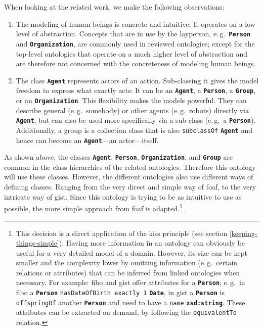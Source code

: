 \documentclass[a4paper, DIV=13, BCOR=0cm]{scrbook}
\newcommand{\eg}{e.\,g.\ }
\newcommand{\class}[1]{\texttt{\textbf{#1}}}
\newcommand{\relation}[1]{\texttt{#1}}
\begin{document}
When looking at the related work, we make the following observations:
\begin{enumerate}
	\item The modeling of human beings is concrete and intuitive: It operates on a low level of abstraction. Concepts that are in use by the layperson, \eg \class{Person} and \class{Organization}, are commonly used in reviewed ontologies; except for the top-level ontologies that operate on a much higher level of abstraction and are therefore not concerned with the concreteness of modeling human beings.
	\item The class \class{Agent} represents actors of an action. Sub-classing it gives the model freedom to express what exactly acts: It can be an \class{Agent}, a \class{Person}, a \class{Group}, or an \class{Organization}. This flexibility makes the models powerful. They can describe general (\eg somebody) or other agents (\eg robots) directly via \class{Agent}, but can also be used more specifically via a sub-class (\eg a \class{Person}). Additionally, a group is a collection class that is also \relation{subclassOf} \class{Agent} and hence can become an \class{Agent}---an actor---itself.
\end{enumerate}

As shown above, the classes \class{Agent}, \class{Person}, \class{Organization}, and \class{Group} are common in the class hierarchies of the related ontologies. Therefore this ontology will use these classes. However, the different ontologies also use different ways of defining classes. Ranging from the very direct and simple way of \gls{foaf}, to the very intricate way of \gls{gist}. Since this ontology is trying to be as intuitive to use as possible, the more simple approach from \gls{foaf} is adapted.\footnote{This decision is a direct application of the \gls{kiss} principle (see section \ref{keeping-things-simple}). Having more information in an ontology can obviously be useful for a very detailed model of a domain. However, its size can be kept smaller and the complexity lower by omitting information (\eg certain relations or attributes) that can be inferred from linked ontologies when necessary. For example: \gls{fibo} and \gls{gist} offer attributes for a \class{Person}; \eg in \gls{fibo} a \class{Person} \relation{hasDateOfBirth exactly 1} \class{Date}, in \gls{gist} a \class{Person} is \relation{offspringOf} another \class{Person} and need to have a \relation{name} \class{xsd:string}. These attributes can be extracted on demand, by following the \relation{equivalentTo} relation.}
\end{document}
